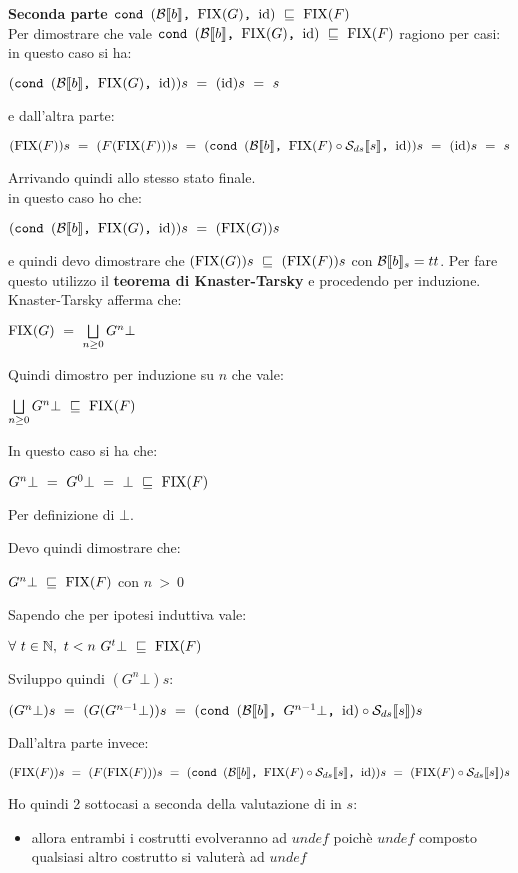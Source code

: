 {    \textbf{Seconda parte $\cond{b}{\fixp{G}}{\idDS}~\mineq~\fixp{F}$}\\
    Per dimostrare che vale $\cond{b}{\fixp{G}}{\idDS}~\mineq~\fixp{F}$ ragiono
    per casi:\\
     in questo caso si ha:
    \begin{center}
    $(\cond{b}{\fixp{G}}{\idDS})s~=~(\idDS)s~=~s$
    \end{center}
    e dall'altra parte:
    \begin{center}
    $(\fixp{F})s~=~(F(\fixp{F}))s~=~(\cond{b}{\fixp{F} \circ{} \Sds{}}{\idDS})s
    ~=~(\idDS)s~=~s$
    \end{center}
    Arrivando quindi allo stesso stato finale.\\
     in questo caso ho che:
    \begin{center}
    $(\cond{b}{\fixp{G}}{\idDS})s~=~(\fixp{G})s$
    \end{center}
    e quindi devo dimostrare che $(\fixp{G})s~\mineq{}~(\fixp{F})s$ con
    $\evalBbs{b}{s}=tt$. Per fare questo utilizzo il \textbf{teorema di
    Knaster-Tarsky} e procedendo per induzione. Knaster-Tarsky afferma che:
    \begin{center}
    $\fixp{G}~=~\unionsem{n}G^{n}\bot$
    \end{center}
    Quindi dimostro per induzione su $n$ che vale:
    \begin{center}
    $\unionsem{n}G^{n}\bot~\mineq~\fixp{F}$
    \end{center}

     In questo caso si ha che:
    \begin{center}
    $G^{n}\bot~=~G^{0}\bot~=~\bot~\mineq~\fixp{F}$
    \end{center}
    Per definizione di $\bot$.

     Devo quindi dimostrare che:
    \begin{center}
    $G^{n}\bot~\mineq~\fixp{F}$ con $n~>~0$
    \end{center}
    Sapendo che per ipotesi induttiva vale:
    \begin{center}
    $\forall~t\in\mathbb{N},~t<n~G^{t}\bot~\mineq~\fixp{F}$
    \end{center}
    Sviluppo quindi $(G^{n}\bot)s$:
    \begin{center}
    $(G^{n}\bot)s~=~(G(G^{n-1}\bot))s~=~
    (\cond{b}{G^{n-1}\bot}{\idDS} \circ \Sds)s$
    \end{center}
    Dall'altra parte invece:
    \begin{center}
    $(\fixp{F})s~=~(F(\fixp{F}))s~=~(\cond{b}{\fixp{F} \circ{} \Sds{}}{\idDS})s~
    =~(\fixp{F} \circ{} \Sds{})s$
    \end{center}
    Ho quindi 2 sottocasi a seconda della valutazione di \Sds{} in $s$:
    \begin{itemize}
    \item {} allora entrambi i costrutti evolveranno ad 
    $undef$ poichè $undef$ composto qualsiasi altro costrutto si valuterà ad 
    $undef$


\end{itemize}}
